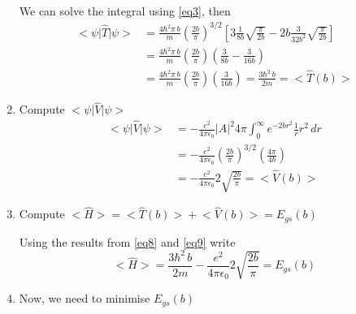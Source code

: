 \documentclass[12 pt]{article}
\numberwithin{equation}{section}
\begin{document}
\begin{enumerate}
\begin{equation}
\begin{aligned}
    \end{aligned}
  \end{equation}
  We can solve the integral using \autoref{eq3}, then
  \begin{equation}
    \label{eq8}
    \begin{aligned}
      \big<\psi\big|\hat{T}\big|\psi\big> &= \frac{4\hbar^2\pi\,b}{m}
      \left(\frac{2b}{\pi}\right)^{3/2}\left[3\frac{1}{8b}\sqrt{\frac{\pi}{2b}}- 2b
      \frac{3}{32b^2}\sqrt{\frac{\pi}{2b}}\right]\\
                                          &=\frac{4\hbar^2\pi\,b}{m}\left(\frac{2b}{\pi}\right)
                                          \left(\frac{3}{8b}-\frac{3}{16b}\right)\\
                                          &= \frac{4\hbar^2\pi\,b}{m}\left(\frac{2b}{\pi}\right)
                                          \left(\frac{3}{16b}\right) = \boxed{
                                          \frac{3\hbar^2\,b}{2m} = \big<\hat{T}(b)\big>}
    \end{aligned}
  \end{equation}
\item Compute $\big<\psi\big|\hat{V}\big|\psi\big>$
  \begin{equation}\label{eq9}
    \begin{aligned}
    \big<\psi\big|\hat{V}\big|\psi\big> &= -\frac{e^2}{4\pi\epsilon_0}\big|A\big|^2 4\pi 
    \int_{0}^{\infty}e^{-2br^2}\frac{1}{r}r^2\,dr\\
                                        &= -\frac{e^2}{4\pi\epsilon_0}\left(\frac{2b}{\pi}\right)^{3/2}
                                        \left(\frac{4\pi}{4b}\right)\\
                                        &=\boxed{-\frac{e^2}{4\pi\epsilon_0}2\sqrt{\frac{2b}{\pi}}
                                        =\big<\hat{V}(b)\big>}
    \end{aligned}
  \end{equation}
\item Compute $\big<\hat{H}\big> = \big<\hat{T}(b)\big> + \big<\hat{V}(b)\big> = E_{gs}(b)$

Using the results from \autoref{eq8} and \autoref{eq9} write 
\begin{equation}\label{eq10}
  \big<\hat{H}\big> = \frac{3\hbar^2\,b}{2m} -\frac{e^2}{4\pi\epsilon_0}2\sqrt{\frac{2b}{\pi}}
   = E_{gs}(b)
\end{equation}
\item Now, we need to minimise $E_{gs}(b)$


\end{enumerate}
\end{document}
